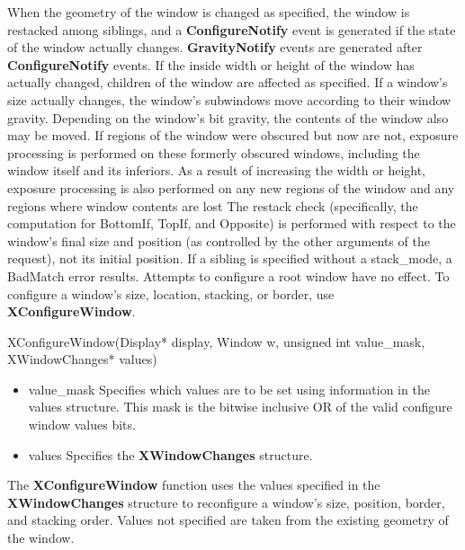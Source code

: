 \documentclass{report}
\begin{document}
\begin{itemize}
            \bigbreak \noindent 
            When the geometry of the window is changed as specified, the window is restacked among siblings, and a \textbf{ConfigureNotify} event is generated if the state of the window actually changes. \textbf{GravityNotify} events are generated after \textbf{ConfigureNotify} events. If the inside width or height of the window has actually changed, children of the window are affected as specified.
            \bigbreak \noindent 
            If a window’s size actually changes, the window’s subwindows move according to their window gravity. Depending on the window’s bit gravity, the contents of the window also may be moved.
            \bigbreak \noindent 
            If regions of the window were obscured but now are not, exposure processing is performed on these formerly obscured windows, including the window itself and its inferiors. As a result of increasing the width or height, exposure processing is also performed on any new regions of the window and any regions where window contents are lost
            \bigbreak \noindent 
            The restack check (specifically, the computation for BottomIf, TopIf, and Opposite) is performed with respect to the window’s final size and position (as controlled by the other arguments of the request), not its initial position. If a sibling is specified without a stack\_mode, a BadMatch error results.
            \bigbreak \noindent 
            Attempts to configure a root window have no effect.
            \bigbreak \noindent 
            To configure a window’s size, location, stacking, or border, use \textbf{XConfigureWindow}.
            \bigbreak \noindent 
            \begin{cppcode}
                XConfigureWindow(Display* display, Window w, unsigned int value_mask, XWindowChanges* values)
            \end{cppcode}
            \begin{itemize}
                \item value\_mask Specifies which values are to be set using information in the values structure. This mask is the bitwise inclusive OR of the valid configure window values bits.
                \item values Specifies the \textbf{XWindowChanges} structure.
            \end{itemize}
            The \textbf{XConfigureWindow} function uses the values specified in the \textbf{XWindowChanges} structure to reconfigure a window’s size, position, border, and stacking order. Values not specified are taken from the existing geometry of the window.

\end{itemize}
\end{document}
